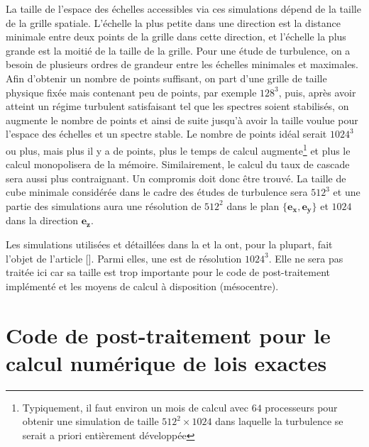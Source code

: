  La taille de l'espace des échelles accessibles via ces simulations dépend de la taille de la grille spatiale. L'échelle la plus petite dans une direction est la distance minimale entre deux points de la grille dans cette direction, et l'échelle la plus grande est la moitié de la taille de la grille. Pour une étude de turbulence, on a besoin de plusieurs ordres de grandeur entre les échelles minimales et maximales. Afin d'obtenir un nombre de points suffisant, on part d'une grille de taille physique fixée mais contenant peu de points, par exemple $128^3$, puis, après avoir atteint un régime turbulent satisfaisant tel que les spectres soient stabilisés, on augmente le nombre de points et ainsi de suite jusqu'à avoir la taille voulue pour l'espace des échelles et un spectre stable. Le nombre de points idéal serait $1024^3$ ou plus, mais plus il y a de points, plus le temps de calcul augmente\footnote{Typiquement, il faut environ un mois de calcul avec $64$ processeurs pour obtenir une simulation de taille $512^2\times 1024$ dans laquelle la turbulence se serait a priori entièrement développée} et plus le calcul monopolisera de la mémoire. Similairement, le calcul du taux de cascade sera aussi plus contraignant. Un compromis doit donc être trouvé. La taille de cube minimale considérée dans le cadre des études de turbulence sera $512^3$ et une partie des simulations aura une résolution de $512^2$ dans le plan $\{\boldsymbol{e_x},\boldsymbol{e_y}\}$ et $1024$ dans la direction $\boldsymbol{e_z}$. 
 
 Les simulations utilisées et détaillées dans la  et la  ont, pour la plupart, fait l'objet de l'article [\cite{ferrand_fluid_2021}]. Parmi elles, une est de résolution $1024^3$. Elle ne sera pas traitée ici car sa taille est trop importante pour le code de post-traitement implémenté et les moyens de calcul à disposition (mésocentre). 
 
 \section{Code de post-traitement pour le calcul numérique de lois exactes }
 \label{sec-312}
 
